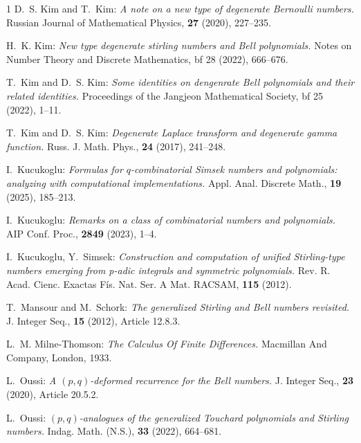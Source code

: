 \documentclass{amsart}
\numberwithin{equation}{section}
\theoremstyle{definition}
\theoremstyle{remark}
\begin{document}
\begin{thebibliography}{1}
{\small {\sc D.~S. Kim and T.~Kim:} {\it A note on a new type of degenerate Bernoulli numbers.}
Russian Journal of Mathematical Physics, {\bf 27} (2020), 227--235.}

{\small {\sc H.~K. Kim:} {\it New type degenerate stirling numbers and Bell polynomials.}
Notes on Number Theory and Discrete Mathematics, {bf 28} (2022), 666–676.}


{\small {\sc T.~Kim and D.~S. Kim:} {\it Some identities on dengenrate Bell polynomials and their related identities.}
Proceedings of the Jangjeon Mathematical Society, {bf 25} (2022), 1--11.}


{\small {\sc T.~Kim and D.~S. Kim:} {\it Degenerate Laplace transform and degenerate gamma function.}
Russ. J. Math. Phys., {\bf 24} (2017), 241--248.}

{\small {\sc I.~Kucukoglu:} {\it Formulas for $q$-combinatorial Simsek numbers and polynomials: analyzing with computational implementations.} Appl. Anal. Discrete Math.,  {\bf 19} (2025), 185--213.}

{\small {\sc I.~Kucukoglu:} {\it Remarks on a class of combinatorial numbers and polynomials.}
AIP Conf. Proc., {\bf 2849} (2023), 1--4.}

{\small {\sc I.~Kucukoglu, Y.~Simsek:} {\it Construction and computation of unified Stirling-type numbers emerging from p-adic integrals and symmetric polynomials.}
Rev. R. Acad. Cienc. Exactas F\'{i}s. Nat. Ser. A Mat. RACSAM, {\bf 115} (2012).}

{\small {\sc T.~Mansour and M.~Schork:} {\it The generalized Stirling and Bell numbers revisited.}
J. Integer Seq., {\bf 15} (2012), Article 12.8.3.}

{\small {\sc L.~M. Milne-Thomson:} {\it The Calculus Of Finite Differences.}
 Macmillan And Company, London, 1933.}

{\small {\sc L.~Oussi:} {\it A $(p, q)$-deformed recurrence for the Bell numbers.}
J. Integer Seq., {\bf 23} (2020), Article 20.5.2.}

{\small {\sc L.~Oussi:} {\it  $(p, q)$-analogues of the generalized Touchard polynomials and Stirling numbers.}
Indag. Math. (N.S.), {\bf 33} (2022), 664–681.} 


\end{thebibliography}
\end{document}
